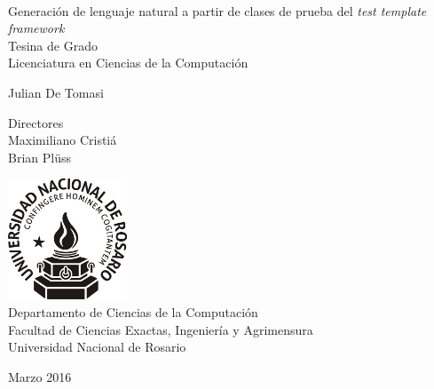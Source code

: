 \documentclass[spanish,11pt,a4paper]{memoir} %
\begin{document}
 

%
%
\thispagestyle{empty}

{%
\sffamily
\centering
\Large

~\vspace{\fill}

{\huge 
Generación de lenguaje natural a partir de clases de prueba del \textit{test template framework}
}\\[0.6em]
Tesina de Grado\\
Licenciatura en Ciencias de la Computación

\vspace{1.5cm}

{\LARGE
Julian De Tomasi
}

\vspace{1.5cm}

{\tiny Directores}\\
Maximiliano Cristiá\\
Brian Plüss\\

\vspace{2.5cm}

\includegraphics[scale=0.8]{img/unr.png}\\
Departamento de Ciencias de la Computación\\
Facultad de Ciencias Exactas, Ingeniería y Agrimensura\\
Universidad Nacional de Rosario

\vspace{\fill}

Marzo 2016

}%

\cleardoublepage


\tableofcontents

\cleardoublepage
\listoffigures

\cleardoublepage
\listofalgorithms
{}













\appendix






\end{document}
